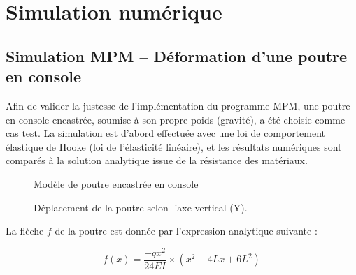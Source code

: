 \documentclass[a4paper,12pt]{report}
\begin{document}
\chapter{Simulation numérique}

\section{Simulation MPM – Déformation d'une poutre en console}

Afin de valider la justesse de l’implémentation du programme MPM, une poutre en console encastrée, soumise à son propre poids (gravité), a été choisie comme cas test.  
La simulation est d’abord effectuée avec une loi de comportement élastique de Hooke (loi de l’élasticité linéaire), et les résultats numériques sont comparés à la solution analytique issue de la résistance des matériaux.


\begin{figure}[h]
    \centering
    \caption{Modèle de poutre encastrée en console}
    \label{fig:ModelPoutre}
\end{figure}

\begin{figure}[h]
    \centering
    \scalebox{0.6}{}
    \caption{Déplacement de la poutre selon l’axe vertical (Y).}
    \label{fig:deplacementPoutre}
\end{figure}

La flèche $f$ de la poutre est donnée par l'expression analytique suivante :

\begin{equation}
    f(x) = \dfrac{-qx^2}{24EI} \times (x^2 - 4Lx + 6L^2)
    \label{eq:fleche}
\end{equation}
\end{document}
